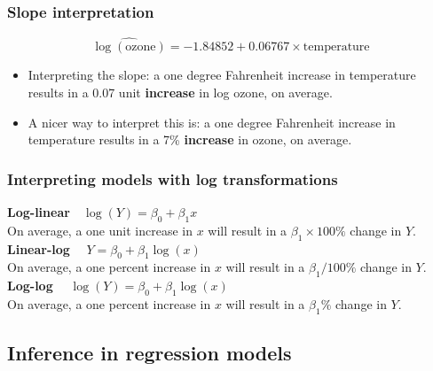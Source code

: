 \documentclass[a4paper]{article}\usepackage[]{graphicx}\usepackage[]{xcolor}
\begin{document}
\subsubsection{Slope interpretation}
\[
	\widehat{\log(\text{ozone})} = -1.84852 + 0.06767\times\text{temperature}
\]
\begin{itemize}
	\item Interpreting the slope: a one degree Fahrenheit increase in temperature results in a 0.07 unit \textbf{increase} in log ozone, on average.
	\item A nicer way to interpret this is: a one degree Fahrenheit increase in temperature results in a 7\% \textbf{increase} in ozone, on average.
\end{itemize}
\subsubsection{Interpreting models with log transformations}
\textbf{Log-linear}\( \quad \log(Y) = \beta_0 + \beta_1 x \)\\
On average, a one unit increase in \( x \) will result in a \( \beta_1 \times 100\% \) change in \( Y \).\\
\textbf{Linear-log} \( \quad Y = \beta_0 + \beta_1 \log(x) \)\\
On average, a one percent increase in \( x \) will result in a \( \beta_1 / 100\% \) change in \( Y \).\\
\textbf{Log-log} \( \quad \log(Y) = \beta_0 + \beta_1 \log(x) \)\\
On average, a one percent increase in \( x \) will result in a \( \beta_1 \% \) change in \( Y \).
\subsection{Inference in regression models}
\end{document}
